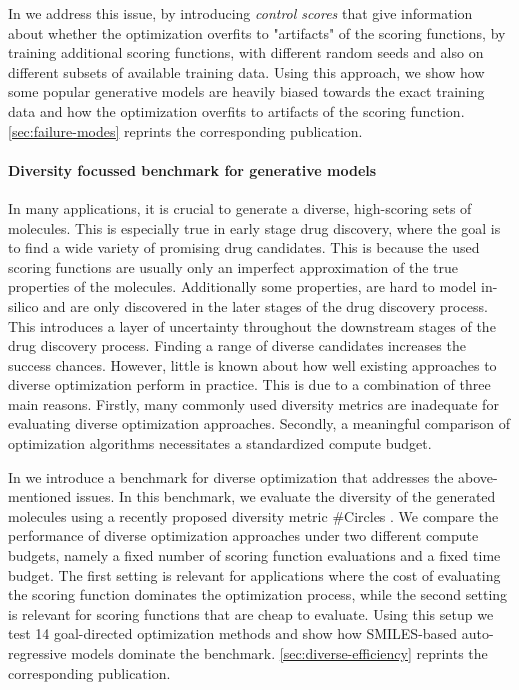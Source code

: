In \citep{renzFailureModesMolecule2019} we address this issue, by introducing \emph{control scores} that give information
about whether the optimization overfits to "artifacts" of the scoring functions, 
by training additional scoring functions, with different random seeds and also on 
different subsets of available training data. Using this approach, 
we show how some popular generative models are heavily biased towards the exact training data
and how the optimization overfits to artifacts of the scoring function. \autoref{sec:failure-modes} 
reprints the corresponding publication.

\paragraph{Diversity focussed benchmark for generative models}
In many applications, it is crucial to generate a diverse, high-scoring sets of molecules. 
This is especially true in early stage drug discovery, where the goal is to find a wide variety of
promising drug candidates. This is because the used scoring functions are usually only an imperfect
approximation of the true properties of the molecules. Additionally some properties, are hard to model 
in-silico and are only discovered in the later stages of the drug discovery process.
This introduces a layer of uncertainty throughout the downstream stages of the drug discovery process. 
Finding a range of diverse candidates increases the success chances. However, little is known 
about how well existing approaches to diverse optimization perform in practice.
This is due to a combination of three main reasons. Firstly, many commonly used diversity metrics 
are inadequate for evaluating diverse optimization approaches. Secondly, a meaningful comparison of
optimization algorithms necessitates a standardized compute budget. 

In \citep{renzBenchmarkingEfficiencyGenerative2024} we introduce a benchmark 
for diverse optimization that addresses the above-mentioned issues. In this benchmark, we
evaluate the diversity of the generated molecules using a recently proposed diversity metric
\#Circles \citep{xie}. We compare the performance of diverse optimization approaches under two
different compute budgets, namely a fixed number of scoring function evaluations and a fixed time budget.
The first setting is relevant for applications where the cost of evaluating the scoring function 
dominates the optimization process, while the second setting is relevant for scoring functions that are
cheap to evaluate. 
Using this setup we test 14 goal-directed optimization methods and show how 
SMILES-based auto-regressive models dominate the benchmark. 
\autoref{sec:diverse-efficiency} reprints the corresponding publication.


